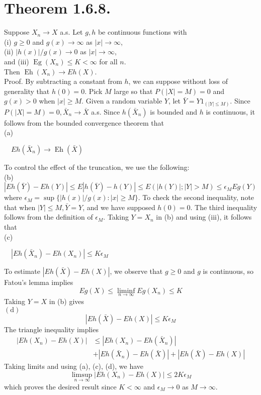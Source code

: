 \documentclass[12pt]{article}
\begin{document}
\section*{Theorem 1.6.8.}
 Suppose $X_n \rightarrow X$ a.s. Let $g, h$ be continuous functions with\\
(i) $g \geq 0$ and $g(x) \rightarrow \infty$ as $|x| \rightarrow \infty$,\\
(ii) $|h(x)| / g(x) \rightarrow 0$ as $|x| \rightarrow \infty$,\\
and (iii) $\operatorname{Eg}\left(X_n\right) \leq K<\infty$ for all $n$.\\
Then $\operatorname{Eh}\left(X_n\right) \rightarrow E h(X)$.\\
Proof. By subtracting a constant from $h$, we can suppose without loss of generality that $h(0)=0$. Pick $M$ large so that $P(|X|=M)=0$ and $g(x)>0$ when $|x| \geq M$. Given a random variable $Y$, let $\bar{Y}=Y 1_{(|Y| \leq M)}$. Since $P(|X|=M)=0, \bar{X}_n \rightarrow \bar{X}$ a.s. Since $h\left(\bar{X}_n\right)$ is bounded and $h$ is continuous, it follows from the bounded convergence theorem that\\
(a) \begin{center}$\quad E h\left(\bar{X}_n\right) \rightarrow \operatorname{Eh}(\bar{X})$ 
\end{center}
To control the effect of the truncation, we use the following:\\
(b)
$|E h(\bar{Y})-E h(Y)| \leq E|h(\bar{Y})-h(Y)| \leq E(|h(Y)| ;|Y|>M) \leq \epsilon_M E g(Y)$
where $\epsilon_M=\sup \{|h(x)| / g(x):|x| \geq M\}$. To check the second inequality, note that when $|Y| \leq M, \bar{Y}=Y$, and we have supposed $h(0)=0$. The third inequality follows from the definition of $\epsilon_M$.
Taking $Y=X_n$ in (b) and using (iii), it follows that\\
(c) \begin{center}$\quad\left|E h\left(\bar{X}_n\right)-E h\left(X_n\right)\right| \leq K \epsilon_M$
\end{center}
To estimate $|E h(\bar{X})-E h(X)|$, we observe that $g \geq 0$ and $g$ is continuous, so Fatou's lemma implies
$$
E g(X) \leq \liminf _{n \rightarrow \infty} E g\left(X_n\right) \leq K
$$
Taking $Y=X$ in (b) gives\\
$(\mathrm{d})$
$$
|E h(\bar{X})-E h(X)| \leq K \epsilon_M
$$
The triangle inequality implies
$$
\begin{aligned}
\left|E h\left(X_n\right)-E h(X)\right| & \leq\left|E h\left(X_n\right)-E h\left(\bar{X}_n\right)\right| \\
& +\left|E h\left(\bar{X}_n\right)-E h(\bar{X})\right|+|E h(\bar{X})-E h(X)|
\end{aligned}
$$
Taking limits and using (a), (c), (d), we have
$$
\limsup _{n \rightarrow \infty}\left|E h\left(X_n\right)-E h(X)\right| \leq 2 K \epsilon_M
$$
which proves the desired result since $K<\infty$ and $\epsilon_M \rightarrow 0$ as $M \rightarrow \infty$.
\end{document}
